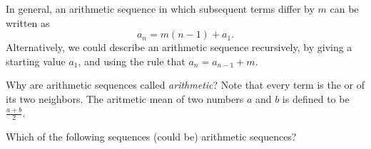 \documentclass{ximera}
\begin{document}
In general, an arithmetic sequence in which subsequent terms differ
by $m$ can be written as
\[
a_n = m (n-1) + a_1.
\]
Alternatively, we could describe an arithmetic sequence recursively,
by giving a starting value $a_1$, and using the rule that $a_{n} =
a_{n-1} + m$.


\begin{remark}
Why are arithmetic sequences called \textit{arithmetic}?  Note that
every term is the  or  of its two
neighbors.  The aritmetic mean of two numbers $a$ and $b$ is defined
to be $\frac{a+b}{2}$.
\end{remark}



\begin{question}
  Which of the following sequences (could be) arithmetic sequences?
  \begin{selectAll}
    
  \end{selectAll}
\end{question}
\end{document}
